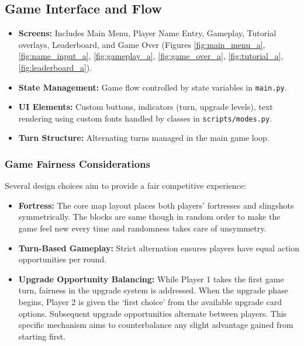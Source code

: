 \documentclass[11pt, a4paper]{article}
\begin{document}
\subsection{Game Interface and Flow}

\begin{itemize}

    \item \textbf{Screens:} Includes Main Menu, Player Name Entry, Gameplay, Tutorial overlays, Leaderboard, and Game Over (Figures \ref{fig:main_menu_a}, \ref{fig:name_input_a}, \ref{fig:gameplay_a}, \ref{fig:game_over_a}, \ref{fig:tutorial_a}, \ref{fig:leaderboard_a}).
    
    \item \textbf{State Management:} Game flow controlled by state variables in \texttt{main.py}.
    
    \item \textbf{UI Elements:} Custom buttons, indicators (turn, upgrade levels), text rendering using custom fonts handled by classes in \texttt{scripts/modes.py}.
    
    \item \textbf{Turn Structure:} Alternating turns managed in the main game loop.

\end{itemize}

\subsubsection{Game Fairness Considerations}

Several design choices aim to provide a fair competitive experience:

\begin{itemize}
    
    \item \textbf{Fortress:} The core map layout places both players' fortresses and slingshots symmetrically. The blocks are same though in random order to make the game feel new every time and randomness takes care of unsymmetry.
        
    \item \textbf{Turn-Based Gameplay:} Strict alternation ensures players have equal action opportunities per round.
    
    \item \textbf{Upgrade Opportunity Balancing:} While Player 1 takes the first game turn, fairness in the upgrade system is addressed. When the upgrade phase begins, Player 2 is given the `first choice' from the available upgrade card options. Subsequent upgrade opportunities alternate between players. This specific mechanism aims to counterbalance any slight advantage gained from starting first.

\end{itemize}
\end{document}
